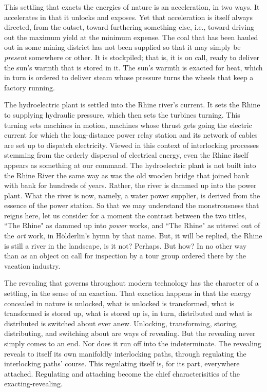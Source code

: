 \documentclass[12pt]{article}
\begin{document}
This settling that exacts the energies of nature is an acceleration, in two ways. It accelerates in that it unlocks and exposes. Yet that acceleration is itself always directed, from the outset, toward furthering something else, i.e., toward driving out the maximum yield at the minimum expense. The coal that has been hauled out in some mining district has not been supplied so that it may simply be \textit{present} somewhere or other. It is stockpiled; that is, it is on call, ready to deliver the sun's warmth that is stored in it. The sun's warmth is exacted for heat, which in turn is ordered to deliver steam whose pressure turns the wheels that keep a factory running.

The hydroelectric plant is settled into the Rhine river's current. It sets the Rhine to supplying hydraulic pressure, which then sets the turbines turning. This turning sets machines in motion, machines whose thrust gets going the electric current for which the long-distance power relay station and its network of cables are set up to dispatch electricity. Viewed in this context of interlocking processes stemming from the orderly dispersal of electrical energy, even the Rhine itself appears as something at our command. The hydroelectric plant is not built into the Rhine River the same way as was the old wooden bridge that joined bank with bank for hundreds of years. Rather, the river is dammed up into the power plant. What the river is now, namely, a water power supplier, is derived from the essence of the power station. So that we may understand the monstrousness that reigns here, let us consider for a moment the contrast between the two titles, ``The Rhine" as dammed up into \textit{power} works, and ``The Rhine" as uttered out of the \textit{art} work, in H\"{o}lderlin's hymn by that name. But, it will be replied, the Rhine is still a river in the landscape, is it not? Perhaps. But how? In no other way than as an object on call for inspection by a tour group ordered there by the vacation industry.

The revealing that governs throughout modern technology has the character of a settling, in the sense of an exaction. That exaction happens in that the energy concealed in nature is unlocked, what is unlocked is transformed, what is transformed is stored up, what is stored up is, in turn, distributed and what is distributed is switched about ever anew. Unlocking, transforming, storing, distributing, and switching about are ways of revealing. But the revealing never simply comes to an end. Nor does it run off into the indeterminate. The revealing reveals to itself its own manifoldly interlocking paths, through regulating the interlocking paths' course. This regulating itself is, for its part, everywhere attached. Regulating and attaching become the chief characterisitics of the exacting-revealing.
\end{document}

